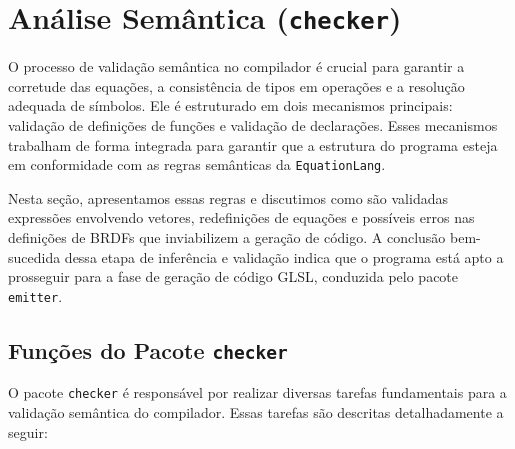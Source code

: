 \section{Análise Semântica (\texttt{checker})} \label{section-checker}
O processo de validação semântica no compilador é crucial para garantir a corretude das equações, a consistência de tipos em operações e a resolução adequada de símbolos. Ele é estruturado em dois mecanismos principais: validação de definições de funções e validação de declarações. Esses mecanismos trabalham de forma integrada para garantir que a estrutura do programa esteja em conformidade com as regras semânticas da \texttt{EquationLang}.

Nesta seção, apresentamos essas regras e discutimos como são validadas expressões envolvendo vetores, redefinições de equações e possíveis erros nas definições de BRDFs que inviabilizem a geração de código. A conclusão bem-sucedida dessa etapa de inferência e validação indica que o programa está apto a prosseguir para a fase de geração de código GLSL, conduzida pelo pacote \texttt{emitter}.


\subsection{Funções do Pacote \texttt{checker}}

O pacote \texttt{checker} é responsável por realizar diversas tarefas fundamentais para a validação semântica do compilador. Essas tarefas são descritas detalhadamente a seguir:

